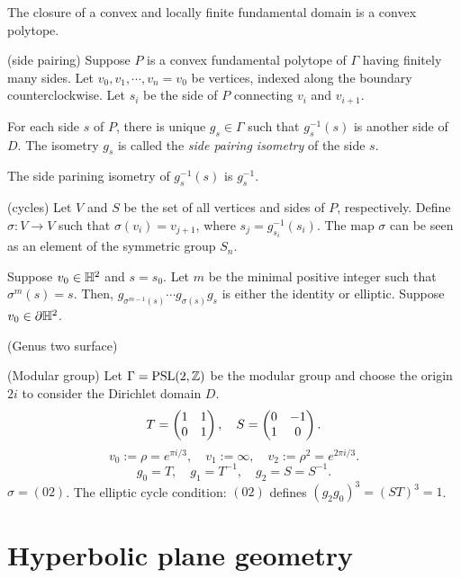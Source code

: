 \documentclass[a4paper]{article}
\begin{document}
\begin{prb}
\begin{parts}
\item The closure of a convex and locally finite fundamental domain is a convex polytope.
\item (side pairing)
Suppose $P$ is a convex fundamental polytope of $\Gamma$ having finitely many sides.
Let $v_0,v_1,\cdots,v_n=v_0$ be vertices, indexed along the boundary counterclockwise.
Let $s_i$ be the side of $P$ connecting $v_i$ and $v_{i+1}$.

For each side $s$ of $P$, there is unique $g_s\in\Gamma$ such that $g_s^{-1}(s)$ is another side of $D$. The isometry $g_s$ is called the \emph{side pairing isometry} of the side $s$.

The side parining isometry of $g_s^{-1}(s)$ is $g_s^{-1}$.
\item (cycles)
Let $V$ and $S$ be the set of all vertices and sides of $P$, respectively.
Define $\sigma:V\to V$ such that $\sigma(v_i)=v_{j+1}$, where $s_j=g_{s_i}^{-1}(s_i)$.
The map $\sigma$ can be seen as an element of the symmetric group $S_n$.

Suppose $v_0\in\mathbb{H}^2$ and $s=s_0$. Let $m$ be the minimal positive integer such that $\sigma^m(s)=s$. Then, $g_{\sigma^{m-1}(s)}\cdots g_{\sigma(s)}g_s$ is either the identity or elliptic.
Suppose $v_0\in\partial\mathbb{H}^2$.
\end{parts}
\end{prb}


\begin{prb}[Examples]
\begin{parts}
\item (Genus two surface)
\item (Modular group)
Let $\Gamma=\mathrm{PSL}(2,\mathbb{Z})$ be the modular group and choose the origin $2i$ to consider the Dirichlet domain $D$.
\[T=\begin{pmatrix}1&1\\0&1\end{pmatrix},\quad S=\begin{pmatrix}0&-1\\1&0\end{pmatrix}.\]
\[v_0:=\rho=e^{\pi i/3},\quad v_1:=\infty,\quad v_2:=\rho^2=e^{2\pi i/3}.\]
\[g_0=T,\quad g_1=T^{-1},\quad g_2=S=S^{-1}.\]
$\sigma=(02)$.
The elliptic cycle condition: $(02)$ defines $(g_2g_0)^3=(ST)^3=1$.
\end{parts}
\end{prb}





\section{Hyperbolic plane geometry}
\end{document}
